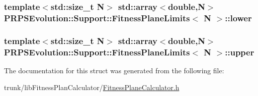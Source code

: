 \hypertarget{struct_p_r_p_s_evolution_1_1_support_1_1_fitness_plane_limits_a6fed33c6e47a2af70ebc068f5cf70c71}{
\subsubsection[{lower}]{\setlength{\rightskip}{0pt plus 5cm}template$<$std\-::size\-\_\-t \-N$>$ std\-::array$<$double,\-N$>$ {\bf \-P\-R\-P\-S\-Evolution\-::\-Support\-::\-Fitness\-Plane\-Limits}$<$ \-N $>$\-::{\bf lower}}}\label{struct_p_r_p_s_evolution_1_1_support_1_1_fitness_plane_limits_a6fed33c6e47a2af70ebc068f5cf70c71}
\hypertarget{struct_p_r_p_s_evolution_1_1_support_1_1_fitness_plane_limits_a029754ad04701b2c1163b7f240b060da}{
\subsubsection[{upper}]{\setlength{\rightskip}{0pt plus 5cm}template$<$std\-::size\-\_\-t \-N$>$ std\-::array$<$double,\-N$>$ {\bf \-P\-R\-P\-S\-Evolution\-::\-Support\-::\-Fitness\-Plane\-Limits}$<$ \-N $>$\-::{\bf upper}}}\label{struct_p_r_p_s_evolution_1_1_support_1_1_fitness_plane_limits_a029754ad04701b2c1163b7f240b060da}


\-The documentation for this struct was generated from the following file\-:\begin{DoxyCompactItemize}
\item 
trunk/lib\-Fitness\-Plan\-Calculator/\hyperlink{_fitness_plane_calculator_8h}{\-Fitness\-Plane\-Calculator.\-h}\end{DoxyCompactItemize}
